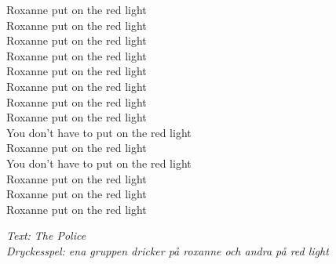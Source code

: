Roxanne put on the red light\\
Roxanne put on the red light\\
Roxanne put on the red light\\
Roxanne put on the red light\\
Roxanne put on the red light\\
Roxanne put on the red light\\
Roxanne put on the red light\\
Roxanne put on the red light\\
You don't have to put on the red light\\
Roxanne put on the red light\\
You don't have to put on the red light\\
Roxanne put on the red light\\
Roxanne put on the red light\\
Roxanne put on the red light
\par
\vspace{10pt}
{\footnotesize\textit{Text: The Police\\ Dryckesspel: ena gruppen dricker på roxanne och andra på red light}}
